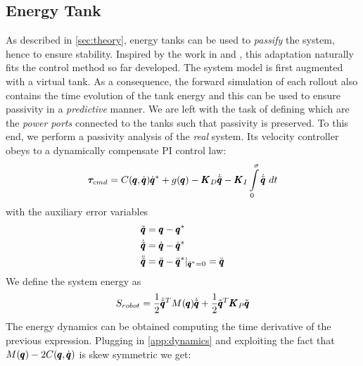 \subsection{Energy Tank}
As described in \sect \ref{sec:theory}, energy tanks can be used to \emph{passify} the system, hence to ensure stability. Inspired by the work in \cite{benzi2021optimization} and \cite{shahriari2018valve}, this adaptation naturally fits the control method so far developed. The system model is first augmented with a virtual tank. As a consequence, the forward simulation of each rollout also contains the time evolution of the tank energy and this can be used to ensure passivity in a \emph{predictive} manner. We are left with the task of defining which are the \emph{power ports} connected to the tanks such that passivity is preserved. To this end, we perform a passivity analysis of the \emph{real} system. Its 
velocity controller obeys to a dynamically compensate PI control law:
\begin{equation}
\boldsymbol{\tau}_{cmd} = C(\pmb{q}, \dot{\pmb{q}}) \dot{\pmb{q}}^* + g(\pmb{q}) - \pmb{K}_D \dot{\tilde{\pmb{q}}} - \pmb{K}_I \int\limits_{0}^{\sigma} \dot{\tilde{\pmb{q}}}\ dt
\end{equation}
 with the auxiliary error variables
\begin{align*}
    \tilde{\pmb{q}} &=  \pmb{q} - \pmb{q}^* \\
    \dot{\tilde{\pmb{q}}} &=  \dot{\pmb{q}} - \dot{\pmb{q}}^* \\
    \ddot{\tilde{\pmb{q}}} &=  \ddot{\pmb{q}} - \ddot{\pmb{q}}^* |_{\ddot{\pmb{q}}^* = 0} = \ddot{\pmb{q}}
\end{align*}
We define the system energy as 
\begin{equation}
    S_{robot} = \frac{1}{2} \dot{\tilde{\pmb{q}}}^T M(\pmb{q}) \dot{\tilde{\pmb{q}}} + \frac{1}{2} \tilde{\pmb{q}}^T \pmb{K}_P \tilde{\pmb{q}}
\end{equation}
The energy dynamics can be obtained computing the time derivative of the previous expression. Plugging in \eqn \eqref{app:dynamics} and exploiting the fact that $M(\pmb{q}) - 2 C(\pmb{q}, \dot{\pmb{q}})$ is skew symmetric we get:
